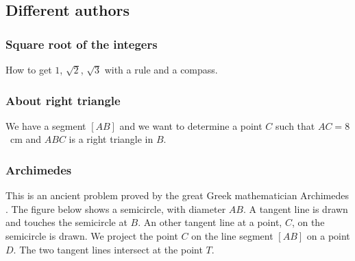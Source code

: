 \subsection{Different authors}

\subsubsection{ Square root of the integers}
How to get $1$, $\sqrt{2}$, $\sqrt{3}$ with a rule and a compass.

\begin{tkzexample}[latex=7cm,small]
\end{tkzexample}


\subsubsection{About right triangle}

We have a segment $[AB]$ and we want to determine a point $C$ such that $AC=8$~cm    and $ABC$ is a right triangle in $B$.

\begin{tkzexample}[latex=7cm]
\end{tkzexample}


\subsubsection{Archimedes}

This is an ancient problem   proved by the great Greek mathematician Archimedes .
The figure below shows a semicircle, with diameter $AB$. A tangent line is drawn and  touches the semicircle at $B$.   An other tangent line at a point, $C$, on the semicircle is drawn. We project the point $C$ on the line segment $[AB]$  on a point $D$. The two tangent lines intersect at the point $T$.


